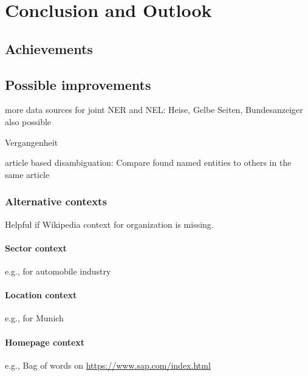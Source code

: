 \section{Conclusion and Outlook}
\label{sec:conclusion}
\subsection{Achievements}
\subsection{Possible improvements}
more data sources for joint NER and NEL: Heise, Gelbe Seiten, Bundesanzeiger also possible

Vergangenheit

article based disambiguation: Compare found named entities to others in the same article

\subsubsection{Alternative contexts}
Helpful if Wikipedia context for organization is missing.
\paragraph{Sector context}
e.g., for automobile industry
\paragraph{Location context}
e.g., for Munich
\paragraph{Homepage context}
e.g., Bag of words on \url{https://www.sap.com/index.html}